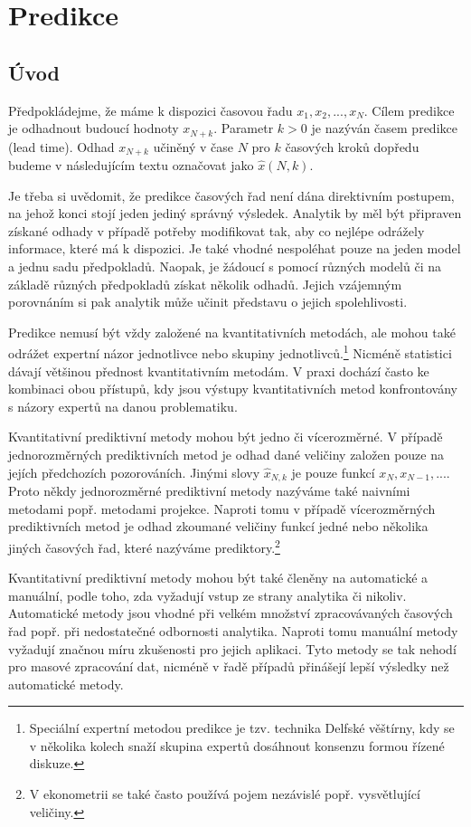 \chapter{Predikce}

\section{Úvod}

Předpokládejme, že máme k dispozici časovou řadu $x_1, x_2, ..., x_N$. Cílem predikce je odhadnout budoucí hodnoty $x_{N + k}$. Parametr $k > 0$ je nazýván časem predikce (lead time). Odhad $x_{N + k}$ učiněný v čase $N$ pro $k$ časových kroků dopředu budeme v následujícím textu označovat jako $\hat{x}(N, k)$.

Je třeba si uvědomit, že predikce časových řad není dána direktivním postupem, na jehož konci stojí jeden jediný správný výsledek. Analytik by měl být připraven získané odhady v případě potřeby modifikovat tak, aby co nejlépe odrážely informace, které má k dispozici. Je také vhodné nespoléhat pouze na jeden model a jednu sadu předpokladů. Naopak, je žádoucí s pomocí různých modelů či na základě různých předpokladů získat několik odhadů. Jejich vzájemným porovnáním si pak analytik může učinit představu o jejich spolehlivosti.

Predikce nemusí být vždy založené na kvantitativních metodách, ale mohou také odrážet expertní názor jednotlivce nebo skupiny jednotlivců.\footnote{Speciální expertní metodou predikce je tzv. technika Delfské věštírny, kdy se v několika kolech snaží skupina expertů dosáhnout konsenzu formou řízené diskuze.} Nicméně statistici dávají většinou přednost kvantitativním metodám. V praxi dochází často ke kombinaci obou přístupů, kdy jsou výstupy kvantitativních metod konfrontovány s názory expertů na danou problematiku.

Kvantitativní prediktivní metody mohou být jedno či vícerozměrné. V případě jednorozměrných prediktivních metod je odhad dané veličiny založen pouze na jejích předchozích pozorováních. Jinými slovy $\hat{x}_{N, k}$ je pouze funkcí $x_N, x_{N-1}, ...$. Proto někdy jednorozměrné prediktivní metody nazýváme také naivními metodami popř. metodami projekce. Naproti tomu v případě vícerozměrných prediktivních metod je odhad zkoumané veličiny funkcí jedné nebo několika jiných časových řad, které nazýváme prediktory.\footnote{V ekonometrii se také často používá pojem nezávislé popř. vysvětlující veličiny.}

Kvantitativní prediktivní metody mohou být také členěny na automatické a manuální, podle toho, zda vyžadují vstup ze strany analytika či nikoliv. Automatické metody jsou vhodné při velkém množství zpracovávaných časových řad popř. při nedostatečné odbornosti analytika. Naproti tomu manuální metody vyžadují značnou míru zkušenosti pro jejich aplikaci. Tyto metody se tak nehodí pro masové zpracování dat, nicméně v řadě případů přinášejí lepší výsledky než automatické metody.


